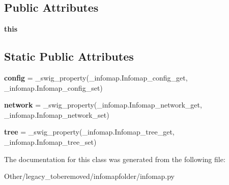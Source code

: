 \subsection*{Public Attributes}
\begin{DoxyCompactItemize}
\item 
\mbox{\label{classinfomapfolder_1_1infomap_1_1Infomap_a9fe2cd3037b9cff465d4e03c6fc594b8}} 
{\bfseries this}
\end{DoxyCompactItemize}
\subsection*{Static Public Attributes}
\begin{DoxyCompactItemize}
\item 
\mbox{\label{classinfomapfolder_1_1infomap_1_1Infomap_aec6ab21abeaf77b5ba3fa7e800f31523}} 
{\bfseries config} = \+\_\+swig\+\_\+property(\+\_\+infomap.\+Infomap\+\_\+config\+\_\+get, \+\_\+infomap.\+Infomap\+\_\+config\+\_\+set)
\item 
\mbox{\label{classinfomapfolder_1_1infomap_1_1Infomap_a1860f5d0939f6b92732048fa5ff1d281}} 
{\bfseries network} = \+\_\+swig\+\_\+property(\+\_\+infomap.\+Infomap\+\_\+network\+\_\+get, \+\_\+infomap.\+Infomap\+\_\+network\+\_\+set)
\item 
\mbox{\label{classinfomapfolder_1_1infomap_1_1Infomap_a45b9b82f94db51e9167864c80e6a32a5}} 
{\bfseries tree} = \+\_\+swig\+\_\+property(\+\_\+infomap.\+Infomap\+\_\+tree\+\_\+get, \+\_\+infomap.\+Infomap\+\_\+tree\+\_\+set)
\end{DoxyCompactItemize}


The documentation for this class was generated from the following file\+:\begin{DoxyCompactItemize}
\item 
Other/legacy\+\_\+toberemoved/infomapfolder/infomap.\+py\end{DoxyCompactItemize}
